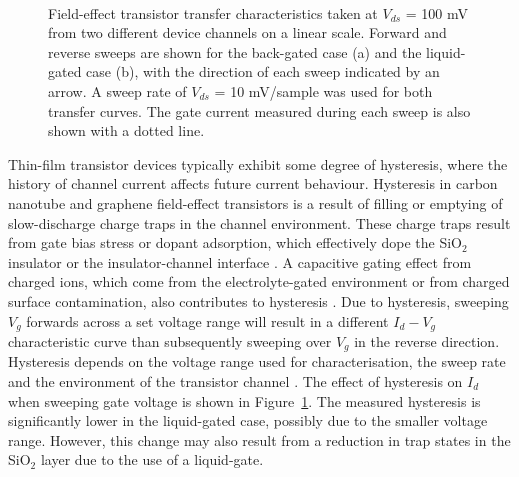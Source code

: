 \documentclass[
  a4paper,
]{scrbook}
\begin{document}
\begin{figure}
\begin{minipage}[t]{0.45\linewidth}
{{}

}

\end{minipage}%
%
\begin{minipage}[t]{0.01\linewidth}

{\centering 

~

}

\end{minipage}%

\caption[Field-effect transistor transfer characteristics of back-gated
and liquid-gated device channels showing
hysteresis.]{\label{fig-gating-hysteresis}Field-effect transistor
transfer characteristics taken at \(V_{ds}\) = 100 mV from two different
device channels on a linear scale. Forward and reverse sweeps are shown
for the back-gated case (a) and the liquid-gated case (b), with the
direction of each sweep indicated by an arrow. A sweep rate of
\(V_{ds}\) = 10 mV/sample was used for both transfer curves. The gate
current measured during each sweep is also shown with a dotted line.}

\end{figure}

Thin-film transistor devices typically exhibit some degree of
hysteresis, where the history of channel current affects future current
behaviour. Hysteresis in carbon nanotube and graphene field-effect
transistors is a result of filling or emptying of slow-discharge charge
traps in the channel environment. These charge traps result from gate
bias stress or dopant adsorption, which effectively dope the SiO\(_2\)
insulator or the insulator-channel interface
\autocite{McEuen2002,Kim2003,Wang2010,Bartolomeo2011,Bargaoui2018,Peng2018}.
A capacitive gating effect from charged ions, which come from the
electrolyte-gated environment or from charged surface contamination,
also contributes to hysteresis \autocite{Wang2010,Yao2021}. Due to
hysteresis, sweeping \(V_g\) forwards across a set voltage range will
result in a different \(I_d - V_g\) characteristic curve than
subsequently sweeping over \(V_g\) in the reverse direction. Hysteresis
depends on the voltage range used for characterisation, the sweep rate
and the environment of the transistor channel
\autocite{Kim2003,Wang2010}. The effect of hysteresis on \(I_d\) when
sweeping gate voltage is shown in Figure~\ref{fig-gating-hysteresis}.
The measured hysteresis is significantly lower in the liquid-gated case,
possibly due to the smaller voltage range. However, this change may also
result from a reduction in trap states in the SiO\(_2\) layer due to the
use of a liquid-gate.
\end{document}
